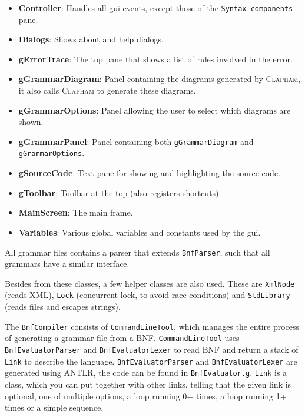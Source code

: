 \documentclass[11pt]{article}
\newcommand*{\an}{\textsc{ANTLR}}
\newcommand*{\cp}{\textsc{Clapham}}
\begin{document}
\begin{itemize}
\item \textbf{Controller}: Handles all gui events, except those of the \texttt{Syntax components} pane.
\item \textbf{Dialogs}: Shows about and help dialogs.
\item \textbf{gErrorTrace}: The top pane that shows a list of rules involved in the error.
\item \textbf{gGrammarDiagram}: Panel containing the diagrams generated by \cp{}, it also calls \cp{} to generate these diagrams.
\item \textbf{gGrammarOptions}: Panel allowing the user to select which diagrams are shown.
\item \textbf{gGrammarPanel}: Panel containing both \texttt{gGrammarDiagram} and \texttt{gGrammarOptions}.
\item \textbf{gSourceCode}: Text pane for showing and highlighting the source code.
\item \textbf{gToolbar}: Toolbar at the top (also registers shortcuts).
\item \textbf{MainScreen}: The main frame.
\item \textbf{Variables}: Various global variables and constants used by the gui.
\end{itemize}

All grammar files contains a parser that extends \texttt{BnfParser}, such that all grammars have a similar interface.

Besides from these classes, a few helper classes are also used. These are \texttt{XmlNode} (reads XML), \texttt{Lock} (concurrent lock, to avoid race-conditions) and \texttt{StdLibrary} (reads files and escapes strings).

The \texttt{BnfCompiler} consists of \texttt{CommandLineTool}, which manages the entire process of generating a grammar file from a BNF.
\texttt{CommandLineTool} uses \texttt{BnfEvaluatorParser} and \texttt{BnfEvaluatorLexer} to read BNF and return a stack of \texttt{Link} to describe the language.
\texttt{BnfEvaluatorParser} and \texttt{BnfEvaluatorLexer} are generated using \an{}, the code can be found in \texttt{BnfEvaluator.g}.
\texttt{Link} is a class, which you can put together with other links, telling that the given link is optional, one of multiple options, a loop running 0+ times, a loop running 1+ times or a simple sequence.
\end{document}
